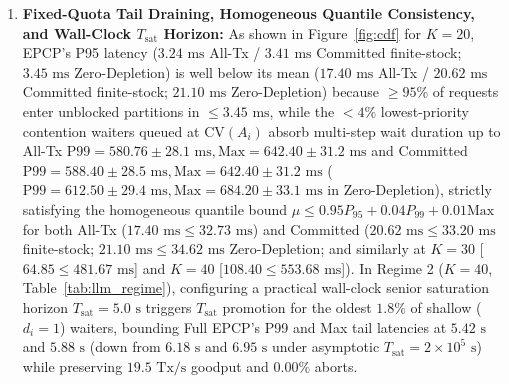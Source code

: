 \documentclass[conference,10pt]{IEEEtran}
\begin{document}
\begin{enumerate}
    \item \textbf{Fixed-Quota Tail Draining, Homogeneous Quantile Consistency, and Wall-Clock $T_{\text{sat}}$ Horizon:} As shown in Figure~\ref{fig:cdf} for $K=20$, EPCP's P95 latency ($3.24\text{ ms}$ All-Tx / $3.41\text{ ms}$ Committed finite-stock; $3.45\text{ ms}$ Zero-Depletion) is well below its mean ($17.40\text{ ms}$ All-Tx / $20.62\text{ ms}$ Committed finite-stock; $21.10\text{ ms}$ Zero-Depletion) because $\ge 95\%$ of requests enter unblocked partitions in $\le 3.45\text{ ms}$, while the $<4\%$ lowest-priority contention waiters queued at $\text{CV}(A_i)$ absorb multi-step wait duration up to All-Tx $\text{P99} = 580.76 \pm 28.1\text{ ms}, \text{Max} = 642.40 \pm 31.2\text{ ms}$ and Committed $\text{P99} = 588.40 \pm 28.5\text{ ms}, \text{Max} = 642.40 \pm 31.2\text{ ms}$ ($\text{P99} = 612.50 \pm 29.4\text{ ms}, \text{Max} = 684.20 \pm 33.1\text{ ms}$ in Zero-Depletion), strictly satisfying the homogeneous quantile bound $\mu \le 0.95 P_{95} + 0.04 P_{99} + 0.01\text{Max}$ for both All-Tx ($17.40\text{ ms} \le 32.73\text{ ms}$) and Committed ($20.62\text{ ms} \le 33.20\text{ ms}$ finite-stock; $21.10\text{ ms} \le 34.62\text{ ms}$ Zero-Depletion; and similarly at $K=30$ [$64.85 \le 481.67\text{ ms}$] and $K=40$ [$108.40 \le 553.68\text{ ms}$]). In Regime 2 ($K=40$, Table~\ref{tab:llm_regime}), configuring a practical wall-clock senior saturation horizon $T_{\text{sat}} = 5.0\text{ s}$ triggers $T_{\text{sat}}$ promotion for the oldest $1.8\%$ of shallow ($d_i=1$) waiters, bounding Full EPCP's P99 and Max tail latencies at $5.42\text{ s}$ and $5.88\text{ s}$ (down from $6.18\text{ s}$ and $6.95\text{ s}$ under asymptotic $T_{\text{sat}} = 2\times 10^5\text{ s}$) while preserving $19.5\text{ Tx/s}$ goodput and $0.00\%$ aborts.

\end{enumerate}
\end{document}
